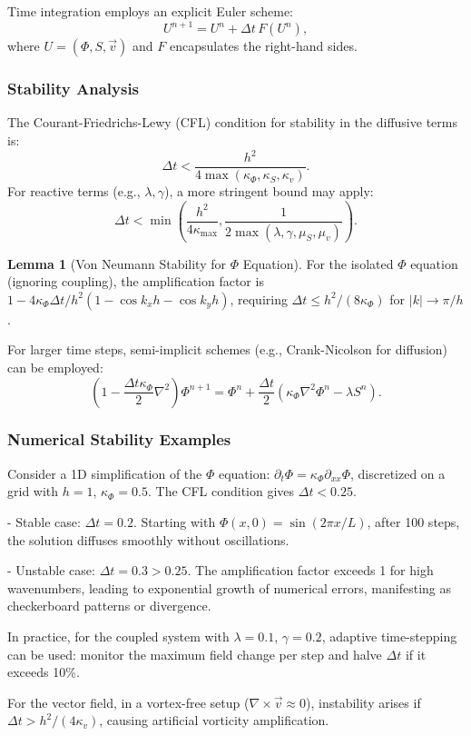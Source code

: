 \documentclass[12pt]{article}
\theoremstyle{definition}
\newtheorem{lemma}{Lemma}[section]
\begin{document}
Time integration employs an explicit Euler scheme:
\[
U^{n+1} = U^n + \Delta t \, F(U^n),
\]
where $U = (\Phi, S, \vec{v})$ and $F$ encapsulates the right-hand sides.

\subsubsection{Stability Analysis}
The Courant-Friedrichs-Lewy (CFL) condition for stability in the diffusive terms is:
\[
\Delta t < \frac{h^2}{4 \max(\kappa_\Phi, \kappa_S, \kappa_v)}.
\]
For reactive terms (e.g., $\lambda, \gamma$), a more stringent bound may apply:
\[
\Delta t < \min\left( \frac{h^2}{4 \kappa_{\max}}, \frac{1}{2 \max(\lambda, \gamma, \mu_S, \mu_v)} \right).
\]

\begin{lemma}[Von Neumann Stability for $\Phi$ Equation]
For the isolated $\Phi$ equation (ignoring coupling), the amplification factor is $1 - 4 \kappa_\Phi \Delta t / h^2 (1 - \cos k_x h - \cos k_y h)$, requiring $\Delta t \leq h^2 / (8 \kappa_\Phi)$ for $|k| \to \pi/h$.
\end{lemma}

For larger time steps, semi-implicit schemes (e.g., Crank-Nicolson for diffusion) can be employed:
\[
(1 - \frac{\Delta t \kappa_\Phi}{2} \nabla^2) \Phi^{n+1} = \Phi^n + \frac{\Delta t}{2} (\kappa_\Phi \nabla^2 \Phi^n - \lambda S^n).
\]

\subsubsection{Numerical Stability Examples}
Consider a 1D simplification of the $\Phi$ equation: $\partial_t \Phi = \kappa_\Phi \partial_{xx} \Phi$, discretized on a grid with $h=1$, $\kappa_\Phi=0.5$. The CFL condition gives $\Delta t < 0.25$.

- Stable case: $\Delta t = 0.2$. Starting with $\Phi(x,0) = \sin(2\pi x / L)$, after 100 steps, the solution diffuses smoothly without oscillations.

- Unstable case: $\Delta t = 0.3 > 0.25$. The amplification factor exceeds 1 for high wavenumbers, leading to exponential growth of numerical errors, manifesting as checkerboard patterns or divergence.

In practice, for the coupled system with $\lambda=0.1$, $\gamma=0.2$, adaptive time-stepping can be used: monitor the maximum field change per step and halve $\Delta t$ if it exceeds 10\%.

For the vector field, in a vortex-free setup ($\nabla \times \vec{v} \approx 0$), instability arises if $\Delta t > h^2 / (4 \kappa_v)$, causing artificial vorticity amplification.
\end{document}
